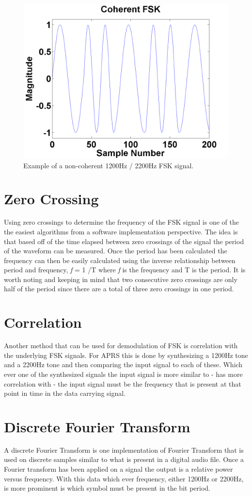 \begin{figure}
  \centering
	\includegraphics[width=0.75\linewidth]{images/CoherentFSK.png} 
	\caption{Example of a non-coherent 1200Hz / 2200Hz FSK signal.}
\end{figure}

\section{Zero Crossing}
Using zero crossings to determine the frequency of the FSK signal is one of the the easiest algorithms from a software implementation perspective. The idea is that based off of the time elapsed between zero crossings of the signal the period of the waveform can be measured. Once the period has been calculated the frequency can then be easily calculated using the inverse relationship between period and frequency, \textit{f} = 1 /T where \textit{f} is the frequency and T is the period. It is worth noting and keeping in mind that two consecutive zero crossings are only half of the period since there are a total of three zero crossings in one period.

\section{Correlation}
Another method that can be used for demodulation of FSK is correlation with the underlying FSK signals. For APRS this is done by synthesizing a 1200Hz tone and a 2200Hz tone and then comparing the input signal to each of these. Which ever one of the synthesized signals the input signal is more similar to - has more correlation with - the input signal must be the frequency that is present at that point in time in the data carrying signal. 

\section{Discrete Fourier Transform}
A discrete Fourier Transform is one implementation of Fourier Transform that is used on discrete samples similar to what is present in a digital audio file. Once a Fourier transform has been applied on a signal the output is a relative power versus frequency. With this data which ever frequency, either 1200Hz or 2200Hz, is more prominent is which symbol must be present in the bit period. 

